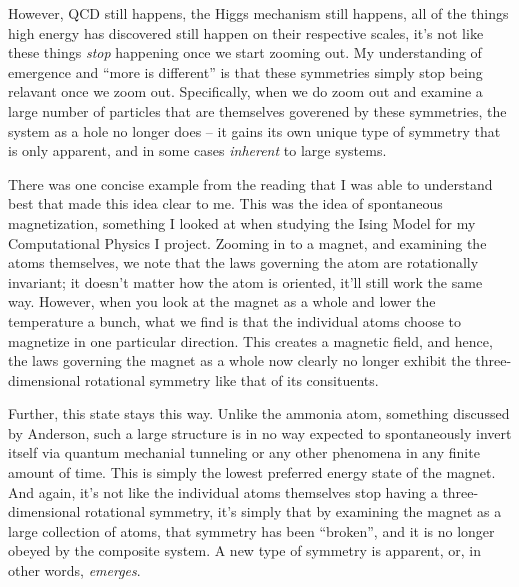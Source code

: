 However, QCD still happens, the Higgs mechanism still happens, all of the things high energy has discovered still happen on their respective scales, it's not like these things \textit{stop} happening once we start zooming out. My understanding of emergence and ``more is different'' is that these symmetries simply stop being relavant once we zoom out. Specifically, when we do zoom out and examine a large number of particles that are themselves goverened by these symmetries, the system as a hole no longer does -- it gains its own unique type of symmetry that is only apparent, and in some cases \textit{inherent} to large systems.

There was one concise example from the reading that I was able to understand best that made this idea clear to me. This was the idea of spontaneous magnetization, something I looked at when studying the Ising Model for my Computational Physics I project. Zooming in to a magnet, and examining the atoms themselves, we note that the laws governing the atom are rotationally invariant; it doesn't matter how the atom is oriented, it'll still work the same way. However, when you look at the magnet as a whole and lower the temperature a bunch, what we find is that the individual atoms choose to magnetize in one particular direction. This creates a magnetic field, and hence, the laws governing the magnet as a whole now clearly no longer exhibit the three-dimensional rotational symmetry like that of its consituents.

Further, this state stays this way. Unlike the ammonia atom, something discussed by Anderson, such a large structure is in no way expected to spontaneously invert itself via quantum mechanial tunneling or any other phenomena in any finite amount of time. This is simply the lowest preferred energy state of the magnet. And again, it's not like the individual atoms themselves stop having a three-dimensional rotational symmetry, it's simply that by examining the magnet as a large collection of atoms, that symmetry has been ``broken'', and it is no longer obeyed by the composite system. A new type of symmetry is apparent, or, in other words, \textit{emerges}.




